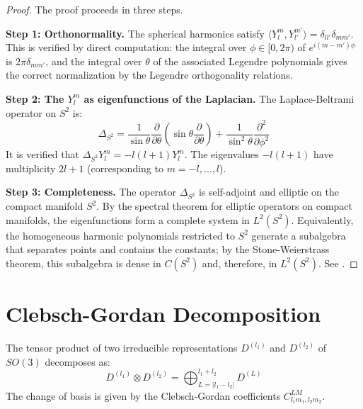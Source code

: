\begin{proof}
The proof proceeds in three steps.

\textbf{Step 1: Orthonormality.} The spherical harmonics satisfy $\langle Y_l^m, Y_{l'}^{m'} \rangle = \delta_{ll'} \delta_{mm'}$. This is verified by direct computation: the integral over $\phi \in [0, 2\pi)$ of $e^{i(m-m')\phi}$ is $2\pi \delta_{mm'}$, and the integral over $\theta$ of the associated Legendre polynomials gives the correct normalization by the Legendre orthogonality relations.

\textbf{Step 2: The $Y_l^m$ as eigenfunctions of the Laplacian.} The Laplace-Beltrami operator on $S^2$ is:
\[
\Delta_{S^2} = \frac{1}{\sin\theta}\frac{\partial}{\partial\theta}\left(\sin\theta\frac{\partial}{\partial\theta}\right) + \frac{1}{\sin^2\theta}\frac{\partial^2}{\partial\phi^2}
\]
It is verified that $\Delta_{S^2} Y_l^m = -l(l+1) Y_l^m$. The eigenvalues $-l(l+1)$ have multiplicity $2l+1$ (corresponding to $m = -l, \ldots, l$).

\textbf{Step 3: Completeness.} The operator $\Delta_{S^2}$ is self-adjoint and elliptic on the compact manifold $S^2$. By the spectral theorem for elliptic operators on compact manifolds, the eigenfunctions form a complete system in $L^2(S^2)$. Equivalently, the homogeneous harmonic polynomials restricted to $S^2$ generate a subalgebra that separates points and contains the constants; by the Stone-Weierstrass theorem, this subalgebra is dense in $C(S^2)$ and, therefore, in $L^2(S^2)$. See \citep[Chapter~IV]{Folland1999}.
\end{proof}

\section{Clebsch-Gordan Decomposition}\label{sec:clebsch_gordan}

\begin{theorem}\label{thm:clebsch_gordan_apendice}
The tensor product of two irreducible representations $D^{(l_1)}$ and $D^{(l_2)}$ of $SO(3)$ decomposes as:
\[
D^{(l_1)} \otimes D^{(l_2)} = \bigoplus_{L=|l_1-l_2|}^{l_1+l_2} D^{(L)}
\]
The change of basis is given by the Clebsch-Gordan coefficients $C_{l_1 m_1, l_2 m_2}^{L M}$.
\end{theorem}

